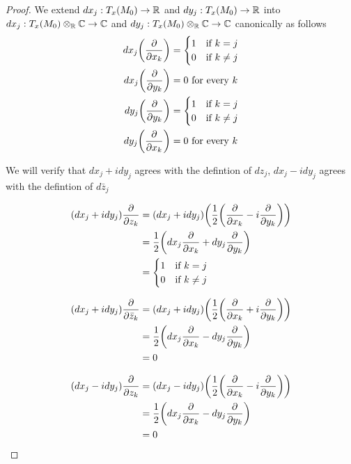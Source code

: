 \documentclass{article}
\begin{document}
\begin{proof}
    We extend $dx_j: T_x(M_0) \to \mathbb{R}$ and $dy_j: T_x(M_0) \to \mathbb{R}$ into $dx_j: T_x(M_0) \otimes_{\mathbb{R}} \mathbb{C} \to \mathbb{C}$ and $dy_j: T_x(M_0) \otimes_{\mathbb{R}} \mathbb{C} \to \mathbb{C}$ canonically as follows
\begin{align*}
    dx_j \tuple*{\frac{\partial}{\partial x_k}} &= \begin{cases}
        1 &\text{if $k=j$} \\
        0 &\text{if $k \neq j$}
    \end{cases} \\
    dx_j \tuple*{\frac{\partial}{\partial y_k}} &= 0 \text{ for every $k$} \\
    dy_j \tuple*{\frac{\partial}{\partial y_k}} &= \begin{cases}
        1 &\text{if $k=j$} \\
        0 &\text{if $k \neq j$}
    \end{cases} \\
    dy_j \tuple*{\frac{\partial}{\partial x_k}} &= 0 \text{ for every $k$}
\end{align*}

We will verify that $dx_j + i dy_j$ agrees with the defintion of $dz_j$, $dx_j - i dy_j$ agrees with the defintion of $d\bar{z}_j$

\begin{align*}
    (dx_j + i dy_j) \frac{\partial}{\partial z_k}
    &= (dx_j + i dy_j) \tuple*{\frac{1}{2} \tuple*{\frac{\partial}{\partial x_k}  - i \frac{\partial}{\partial y_k}}} \\
    &= \frac{1}{2} \tuple*{dx_j \frac{\partial}{\partial x_k} + dy_j \frac{\partial}{\partial y_k}} \\
    &= \begin{cases}
        1 &\text{if $k = j$} \\
        0 &\text{if $k \neq j$}
    \end{cases}
\end{align*}

\begin{align*}
    (dx_j + i dy_j) \frac{\partial}{\partial \bar{z}_k}
    &= (dx_j + i dy_j) \tuple*{\frac{1}{2} \tuple*{\frac{\partial}{\partial x_k}  + i \frac{\partial}{\partial y_k}}} \\
    &= \frac{1}{2} \tuple*{dx_j \frac{\partial}{\partial x_k} - dy_j \frac{\partial}{\partial y_k}} \\
    &= 0
\end{align*}

\begin{align*}
    (dx_j - i dy_j) \frac{\partial}{\partial z_k}
    &= (dx_j - i dy_j) \tuple*{\frac{1}{2} \tuple*{\frac{\partial}{\partial x_k}  - i \frac{\partial}{\partial y_k}}} \\
    &= \frac{1}{2} \tuple*{dx_j \frac{\partial}{\partial x_k} - dy_j \frac{\partial}{\partial y_k}} \\
    &= 0
\end{align*}


\end{proof}
\end{document}
